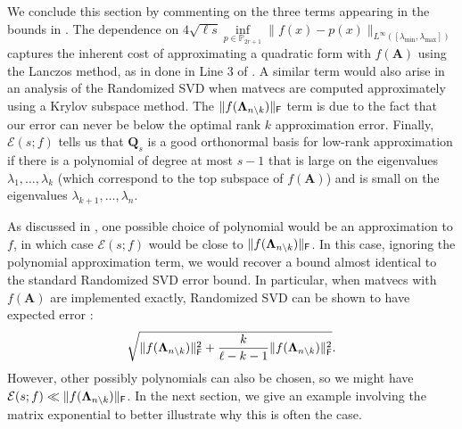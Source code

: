 We conclude this section by commenting on the three terms appearing in the bounds in . 
The dependence on $4\sqrt{\ell s}  \inf\limits_{p \in \mathbb{P}_{2r+1}}\|f(x)-p(x)\|_{L^{\infty}([\lambda_{\min},\lambda_{\max}])}$ captures the inherent cost of approximating a quadratic form with $f(\bm{A})$ using the Lanczos method, as in done in Line 3 of . A similar term would also arise in an analysis of the Randomized SVD when matvecs are computed approximately using a Krylov subspace method.
The $\|f(\bm{\Lambda}_{n \setminus k})\|_{\textsf{\textup{F}}}$ term is due to the fact that our error can never be below the optimal rank $k$ approximation error. Finally, $\mathcal{E}(s;f)$ tells us that $\bm{Q}_s$ is a good orthonormal basis for low-rank approximation if there is a polynomial of degree at most $s-1$ that is large on the eigenvalues $\lambda_1,\ldots,\lambda_k$ (which correspond to the top subspace of $f(\bm{A})$) and is small on the eigenvalues $\lambda_{k+1},\ldots,\lambda_n$. 

As discussed in , one possible choice of polynomial would be an approximation to $f$, in which case $\mathcal{E}(s;f)$ would be close to $\|f(\bm{\Lambda}_{n \setminus k})\|_{\textsf{\textup{F}}}$. In this case, ignoring the polynomial approximation term, we would recover a bound almost identical to the standard Randomized SVD error bound. In particular, when matvecs with $f(\bm{A})$ are implemented exactly, Randomized SVD can be shown to have expected error \cite{rsvd}:
\begin{align*}
\sqrt{\|f(\bm{\Lambda}_{n \setminus k})\|_{\textsf{\textup{F}}}^2 + \frac{k}{\ell-k-1}\|f(\bm{\Lambda}_{n \setminus k})\|_{\textsf{\textup{F}}}^2}.
\end{align*}
However, other possibly polynomials can also be chosen, so we might have $\mathcal{E}(s;f)  \ll \|f(\bm{\Lambda}_{n \setminus k})\|_{\textsf{\textup{F}}}$. In the next section, we give an example involving the matrix exponential to better illustrate why this is often the case. 



